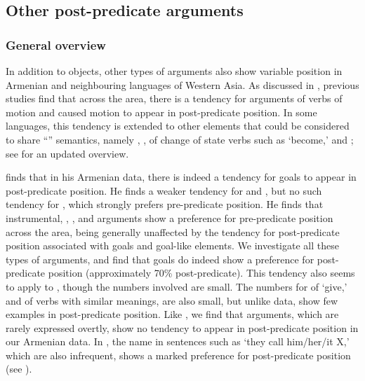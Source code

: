 \documentclass[output=paper,colorlinks,citecolor=brown,draftmode]{langscibook}
\begin{document}
\subsection{Other post-predicate arguments}\label{Armenian:ss:3.3}

\subsubsection{General overview}\label{Armenian:ss:3.3.1}

In addition to objects, other types of arguments also show variable position in Armenian and neighbouring languages of Western Asia. As discussed in \citet{haig_introduction_2018}, previous studies find that across the area, there is a tendency for  arguments of verbs of motion and caused motion to appear in post-predicate position. In some languages, this tendency is extended to other elements that could be considered to share ``'' semantics, namely , ,  of change of state verbs such as `become,' and ; see  for an updated overview.

\citet{stilo_preverbal_2018} finds that in his Armenian data, there is indeed a tendency for goals to appear in post-predicate position. He finds a weaker tendency for  and , but no such tendency for , which strongly prefers pre-predicate position. He finds that instrumental, , , and  arguments show a preference for pre-predicate position across the area, being generally unaffected by the tendency for post-predicate position associated with goals and goal-like elements. We investigate all these types of arguments, and find that goals do indeed show a preference for post-predicate position (approximately 70\% post-predicate). This tendency also seems to apply to , though the numbers involved are small. The numbers for  of `give,' and of verbs with similar meanings, are also small, but unlike  data, show few examples in post-predicate position. Like \citet{stilo_preverbal_2018}, we find that  arguments, which are rarely expressed overtly, show no tendency to appear in post-predicate position in our Armenian data. In , the name in sentences such as `they call him/her/it X,' which are also infrequent, shows a marked preference for post-predicate position (see ).
\end{document}
